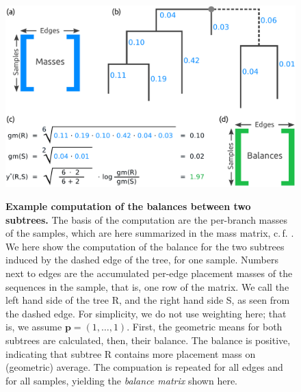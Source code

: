 \begin{figure}[!htb]
    \centering
    \includegraphics[width=1\linewidth]{pdf/balances.pdf}
    \begin{subfigure}{0pt}
        \label{fig:balances:sub:masses}
    \end{subfigure}
    \begin{subfigure}{0pt}
        \label{fig:balances:sub:tree}
    \end{subfigure}
    \begin{subfigure}{0pt}
        \label{fig:balances:sub:calculation}
    \end{subfigure}
    \begin{subfigure}{0pt}
        \label{fig:balances:sub:balances}
    \end{subfigure}
    \caption[Example computation of the balances between two subtrees]{
        \textbf{Example computation of the balances between two subtrees.}
        The basis of the computation are the per-branch masses of the samples, 
        which are here summarized in the mass matrix, c.\,f. .
        We here show the computation of the balance for the two subtrees induced by the dashed edge of the tree,
        for one sample.
        Numbers next to edges are the accumulated per-edge placement masses of the sequences in the sample,
        that is, one row of the matrix.
        We call the left hand side of the tree R, and the right hand side S, as seen from the dashed edge.
        For simplicity, we do not use weighting here; that is, we assume $\bm{p} = ( 1, \ldots, 1 )$.
        First, the geometric means for both subtrees are calculated, then, their balance.
        The balance is positive, indicating that subtree R contains more placement mass on (geometric) average.
        The compuation is repeated for all edges and for all samples, yielding the \emph{balance matrix} shown here.
    }
    \label{fig:balances}
\end{figure}

